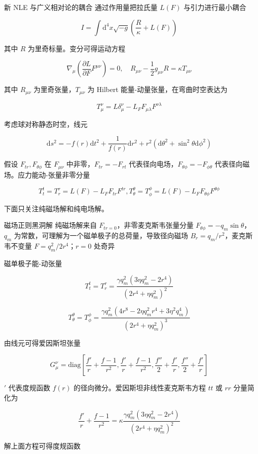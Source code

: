 \documentclass[9pt, dvipsnames]{beamer} %
\begin{document}
\begin{frame}{新 NLE 与广义相对论的耦合}
    通过作用量把拉氏量 $L(F) $ 与引力进行最小耦合

    $$
    I
    =\int \mathrm{d}^4 x\sqrt{-g}\left(\frac{R }{\kappa } + L(F) \right) 
    $$
    
    其中 $R $ 为里奇标量。变分可得运动方程
    
    $$
    \nabla_\mu\left(\frac{\partial L }{\partial F } F^{\mu\nu} \right)
    =0,\quad
    R_{\mu\nu} - \frac{1 }{2 } g_{\mu\nu} R
    =\kappa T_{\mu\nu}
    $$
    
    其中 $R_{\mu\nu} $ 为里奇张量，$T_{\mu\nu} $ 为 Hilbert 能量-动量张量，在弯曲时空表达为
    
    $$
    T_\mu^\nu
    =L\delta_\mu^\nu - L_F F_{\mu\lambda} F^{\nu \lambda}
    $$
    
    考虑球对称静态时空，线元
    
    $$
    \mathrm{d}s^2
    =-f(r)\mathrm{d}t^2 + \frac{1 }{f(r) } \mathrm{d}r^2 + r^2\left(\mathrm{d}\theta^2+\sin^2\theta\mathrm{d}\phi^2 \right)
    $$
    
    假设 $F_{tr},F_{\theta\phi} $ 在 $F_{\mu\nu} $ 中非零，$F_{tr}=-F_{rt} $ 代表径向电场，$F_{\theta\phi}=-F_{\phi\theta} $ 代表径向磁场。应力能动-张量非零分量
    
    $$
    T_t^t = T_r^r
    =L(F) - L_F F_{tr}F^{tr},
    T_\theta^\theta
    =T_\phi^\phi
    =L(F) - L_F F_{\theta\phi}F^{\theta\phi}
    $$
    
    下面只关注纯磁场解和纯电场解。
\end{frame}

\begin{frame}{磁场正则黑洞解 }
    纯磁场解来自 $F_{tr=0} $，非零麦克斯韦张量分量 $F_{\theta\phi}=-q_m \sin\theta $，$q_m $ 为常数，可理解为一个磁单极子的总荷量，导致径向磁场 $B_r=q_m/r^2 $，麦克斯韦不变量 $F=q_m^2/2r^4 $；$r=0 $ 处奇异

    磁单极子能-动张量
    
    $$
    T_t^t
    =T_r^r
    =\frac{\gamma q_m^2\left(3\eta q_m^2-2r^4 \right) }{\left(2r^4+\eta q_m^2 \right)^2 }
    $$
    
    $$
    T_\theta^\theta
    =T_\phi^\phi
    =\frac{\gamma q_m^2\left(4 r^8-2\eta q_m^2 r^4+3\eta^2q_m^4 \right) }{\left(2r^4+\eta q_m^2 \right)^3 }
    $$
    
    由线元可得爱因斯坦张量
    
    $$
    G_\mu^\nu
    =\mathrm{diag}\left[\frac{f' }{r } + \frac{f-1 }{r^2 } ,\frac{f' }{r } + \frac{f-1 }{r^2 } , \frac{f'' }{2 } + \frac{f' }{r } , \frac{f'' }{2 } + \frac{f' }{r }  \right]
    $$
    
    $' $ 代表度规函数 $f(r) $ 的径向微分。爱因斯坦非线性麦克斯韦方程 $tt $ 或 $rr $ 分量简化为
    
    $$
    \frac{f' }{r } + \frac{f-1 }{r^2 } 
    =\kappa \frac{\gamma q_m^2\left(3\eta q_m^2-2r^4 \right) }{\left(2r^4+\eta q_m^2 \right)^2 }
    $$
    
    解上面方程可得度规函数
\end{frame}
\end{document}
